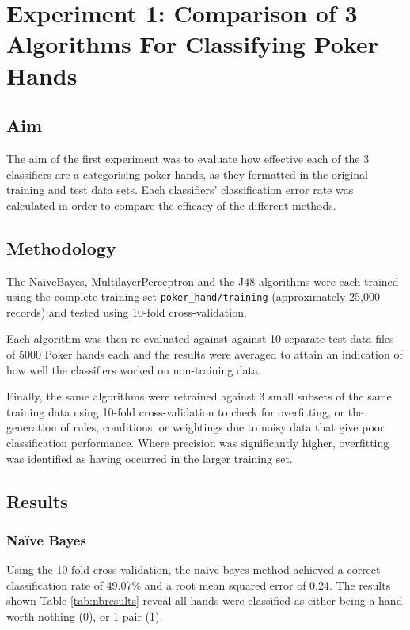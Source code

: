 \documentclass[11pt, a4paper]{article}
\begin{document}
\section*{Experiment 1: Comparison of 3 Algorithms For Classifying Poker Hands}

\subsection*{Aim}

The aim of the first experiment was to evaluate how effective each of the 3 classifiers are a categorising poker hands, as they formatted in the original training and test data sets. Each classifiers' classification error rate was calculated in order to compare the efficacy of the different methods.

\subsection*{Methodology}

The Na\"iveBayes, MultilayerPerceptron and the J48 algorithms were each trained using the complete training set \texttt{poker\_hand/training} (approximately 25,000 records) and tested using 10-fold cross-validation.

Each algorithm was then re-evaluated against against 10 separate test-data files of 5000 Poker hands each and the results were averaged to attain an indication of how well the classifiers worked on non-training data.

Finally, the same algorithms were retrained against 3 small subsets of the same training data using 10-fold cross-validation to check for overfitting, or the generation of rules, conditions, or weightings due to noisy data that give poor classification performance. Where precision was significantly higher, overfitting was identified as having occurred in the larger training set.

\subsection*{Results}

\subsubsection*{Na\"ive Bayes}

Using the 10-fold cross-validation, the na\"ive bayes method achieved a correct classification rate of 49.07\% and a root mean squared error of 0.24. The results shown Table \ref{tab:nbresults} reveal all hands were classified as either being a hand worth nothing (0), or 1 pair (1). 
\end{document}
